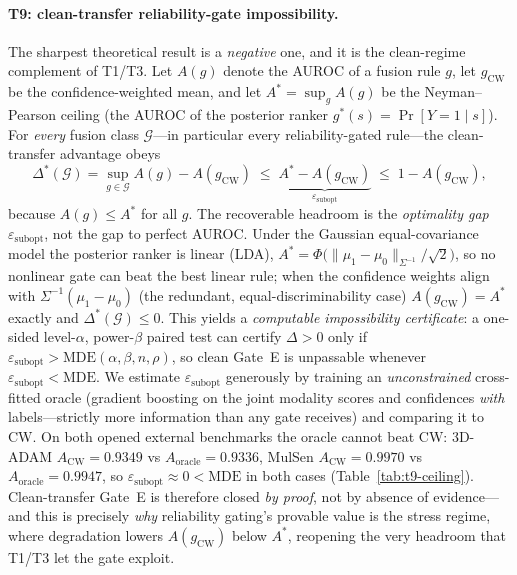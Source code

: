 \documentclass[10pt,conference]{IEEEtran}
\begin{document}
\paragraph{T9: clean-transfer reliability-gate impossibility.} The
sharpest theoretical result is a \emph{negative} one, and it is the
clean-regime complement of T1/T3. Let $A(g)$ denote the AUROC of a
fusion rule $g$, let $g_{\mathrm{CW}}$ be the confidence-weighted mean,
and let $A^{*}=\sup_g A(g)$ be the Neyman--Pearson ceiling (the AUROC of
the posterior ranker $g^{*}(s)=\Pr[Y{=}1\mid s]$). For \emph{every}
fusion class $\mathcal{G}$---in particular every reliability-gated
rule---the clean-transfer advantage obeys
\begin{equation}
\Delta^{*}(\mathcal{G})=\sup_{g\in\mathcal{G}}A(g)-A(g_{\mathrm{CW}})
  \;\le\; \underbrace{A^{*}-A(g_{\mathrm{CW}})}_{\varepsilon_{\mathrm{subopt}}}
  \;\le\; 1-A(g_{\mathrm{CW}}),
\label{eq:t9-ceiling}
\end{equation}
because $A(g)\le A^{*}$ for all $g$. The recoverable headroom is the
\emph{optimality gap} $\varepsilon_{\mathrm{subopt}}$, not the gap to
perfect AUROC. Under the Gaussian equal-covariance model the posterior
ranker is linear (LDA), $A^{*}=\Phi\!\big(\lVert\mu_1-\mu_0\rVert_{\Sigma^{-1}}/\sqrt2\big)$,
so no nonlinear gate can beat the best linear rule; when the confidence
weights align with $\Sigma^{-1}(\mu_1-\mu_0)$ (the redundant,
equal-discriminability case) $A(g_{\mathrm{CW}})=A^{*}$ exactly and
$\Delta^{*}(\mathcal{G})\le 0$. This yields a \emph{computable
impossibility certificate}: a one-sided level-$\alpha$, power-$\beta$
paired test can certify $\Delta>0$ only if
$\varepsilon_{\mathrm{subopt}}>\mathrm{MDE}(\alpha,\beta,n,\rho)$, so
clean Gate~E is unpassable whenever
$\varepsilon_{\mathrm{subopt}}<\mathrm{MDE}$. We estimate
$\varepsilon_{\mathrm{subopt}}$ generously by training an
\emph{unconstrained} cross-fitted oracle (gradient boosting on the joint
modality scores and confidences \emph{with} labels---strictly more
information than any gate receives) and comparing it to CW. On both
opened external benchmarks the oracle cannot beat CW: 3D-ADAM
$A_{\mathrm{CW}}{=}0.9349$ vs $A_{\mathrm{oracle}}{=}0.9336$, MulSen
$A_{\mathrm{CW}}{=}0.9970$ vs $A_{\mathrm{oracle}}{=}0.9947$, so
$\varepsilon_{\mathrm{subopt}}\approx0<\mathrm{MDE}$ in both cases
(Table~\ref{tab:t9-ceiling}). Clean-transfer Gate~E is therefore closed
\emph{by proof}, not by absence of evidence---and this is precisely
\emph{why} reliability gating's provable value is the stress regime,
where degradation lowers $A(g_{\mathrm{CW}})$ below $A^{*}$, reopening
the very headroom that T1/T3 let the gate exploit.
\end{document}
